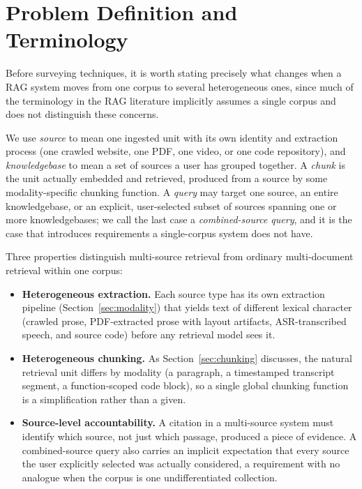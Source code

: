 \documentclass[conference]{IEEEtran}
\begin{document}
\section{Problem Definition and Terminology}
\label{sec:problem}

Before surveying techniques, it is worth stating precisely what changes when a RAG system moves from one corpus to several heterogeneous ones, since much of the terminology in the RAG literature implicitly assumes a single corpus and does not distinguish these concerns.

We use \emph{source} to mean one ingested unit with its own identity and extraction process (one crawled website, one PDF, one video, or one code repository), and \emph{knowledgebase} to mean a set of sources a user has grouped together. A \emph{chunk} is the unit actually embedded and retrieved, produced from a source by some modality-specific chunking function. A \emph{query} may target one source, an entire knowledgebase, or an explicit, user-selected subset of sources spanning one or more knowledgebases; we call the last case a \emph{combined-source query}, and it is the case that introduces requirements a single-corpus system does not have.

Three properties distinguish multi-source retrieval from ordinary multi-document retrieval within one corpus:

\begin{itemize}
\item \textbf{Heterogeneous extraction.} Each source type has its own extraction pipeline (Section~\ref{sec:modality}) that yields text of different lexical character (crawled prose, PDF-extracted prose with layout artifacts, ASR-transcribed speech, and source code) before any retrieval model sees it.
\item \textbf{Heterogeneous chunking.} As Section~\ref{sec:chunking} discusses, the natural retrieval unit differs by modality (a paragraph, a timestamped transcript segment, a function-scoped code block), so a single global chunking function is a simplification rather than a given.
\item \textbf{Source-level accountability.} A citation in a multi-source system must identify which source, not just which passage, produced a piece of evidence. A combined-source query also carries an implicit expectation that every source the user explicitly selected was actually considered, a requirement with no analogue when the corpus is one undifferentiated collection.
\end{itemize}
\end{document}
